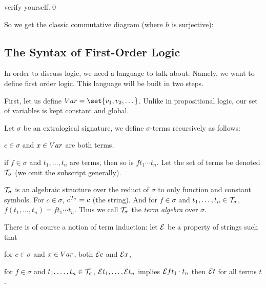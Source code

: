 \ethrm

\Proof verify yourself.\qed

So we get the classic commutative diagram (where $h$ is surjective):

\bigskip
\centerline{
\def\diagrowbuf{1cm}
\def\diagcolbuf{1cm}
}
\bigskip

\subsection{The Syntax of First-Order Logic}

In order to discuss logic, we need a language to talk about.
Namely, we want to define first order logic.
This language will be built in two steps.

First, let us define $\Var=\set{v_1,v_2,\dots}$.
Unlike in propositional logic, our set of variables is kept constant and global.

\bdefn

    Let $\sigma$ be an extralogical signature, we define $\sigma$-terms recursively
    as follows:
    \benum
        \item $c\in\sigma$ and $x\in {\sl Var}$ are both terms.
        \item if $f\in\sigma$ and $t_1,\dots,t_n$ are terms, then so is $ft_1\cdots t_n$.
    \eenum
    Let the set of terms be denoted ${\cal T}_\sigma$ (we omit the subscript generally).

\edefn

${\cal T}_\sigma$ is an algebraic structure over the reduct of $\sigma$ to only function and
constant symbols.
For $c\in\sigma$, $c^{{\cal T}_\sigma}=c$ (the string).
And for $f\in\sigma$ and $t_1,\dots,t_n\in{\cal T}_\sigma$, $f(t_1,\dots,t_n)=ft_1\cdots t_n$.
Thus we call ${\cal T}_\sigma$ the {\it term algebra} over $\sigma$.

There is of course a notion of term induction: let ${\cal E}$ be a property of strings such that
\benum
    \item for $c\in\sigma$ and $x\in {\sl Var}$, both ${\cal E}c$ and ${\cal E}x$,
    \item for $f\in\sigma$ and $t_1,\dots,t_n\in{\cal T}_\sigma$, ${\cal E}t_1,\dots,{\cal E}t_n$ implies
            ${\cal E}ft_1\cdot t_n$
\eenum
then ${\cal E}t$ for all terms $t$.

